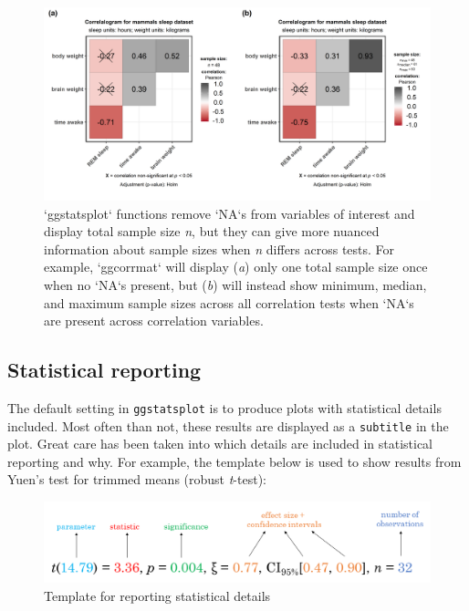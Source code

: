 \documentclass[]{article}
\begin{document}
\begin{figure}[H]
\includegraphics[width=1\linewidth]{./figures/paper-fig4-1} \caption{`ggstatsplot` functions remove `NA`s from variables of interest and display total sample size \textit{n}, but they can give more nuanced information about sample sizes when \textit{n} differs across tests. For example, `ggcorrmat` will display (\textit{a}) only one total sample size once when no `NA`s present, but (\textit{b}) will instead show minimum, median, and maximum sample sizes across all correlation tests when `NA`s are present across correlation variables.}\label{fig:fig4}
\end{figure}

\hypertarget{statistical-reporting}{%
\subsection{Statistical reporting}\label{statistical-reporting}}

The default setting in \texttt{ggstatsplot} is to produce plots with statistical
details included. Most often than not, these results are displayed as a \texttt{subtitle}
in the plot. Great care has been taken into which details are included in
statistical reporting and why. For example, the template below is used to show
results from Yuen's test for trimmed means (robust \emph{t}-test):

\begin{figure}
\centering
\includegraphics{figures/stats_reporting_format.png}
\caption{Template for reporting statistical details}
\end{figure}
\end{document}
